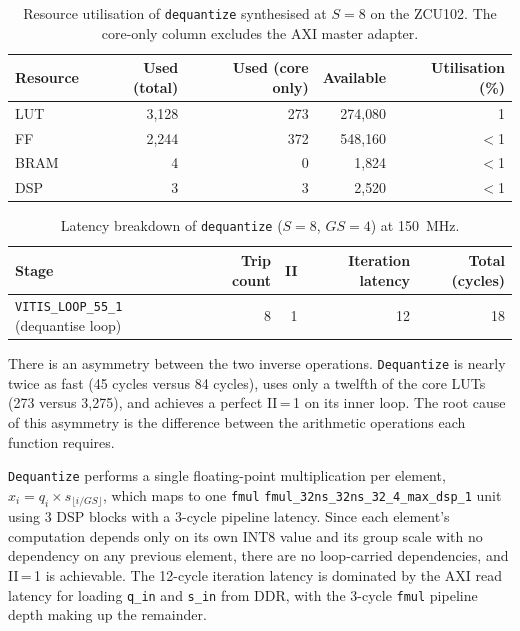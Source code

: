 \begin{table}[H]
  \centering
  \begin{tabular}{lrrrr}
    \toprule
    Resource & Used (total) & Used (core only) & Available & Utilisation (\%) \\
    \midrule
    LUT  & 3{,}128 &   273 & 274{,}080 & 1 \\
    FF   & 2{,}244 &   372 & 548{,}160 & $<$1 \\
    BRAM & 4       &     0 & 1{,}824   & $<$1 \\
    DSP  & 3       &     3 & 2{,}520   & $<$1 \\
    \bottomrule
  \end{tabular}
  \caption{Resource utilisation of \texttt{dequantize} synthesised at
           $S = 8$ on the ZCU102. The core-only column excludes the
           AXI master adapter.}
  \label{tab:dequantize_resources}

\end{table}

\begin{table}[H]
  \centering
  \begin{tabular}{lrrrr}
    \toprule
    Stage & Trip count & II & Iteration latency & Total (cycles) \\
    \midrule
    \texttt{VITIS\_LOOP\_55\_1} (dequantise loop) & 8 & 1 & 12 & 18 \\
    \bottomrule
  \end{tabular}
  \caption{Latency breakdown of \texttt{dequantize} ($S = 8$, $GS = 4$)
           at \SI{150}{\mega\hertz}.}
  \label{tab:dequantize_latency}

\end{table}

There is an asymmetry between the two
inverse operations. \texttt{Dequantize} is nearly twice as fast (45
cycles versus 84 cycles), uses only a twelfth of the core LUTs
(273 versus 3{,}275), and achieves a perfect II\,=\,1 on its inner
loop. The root cause of this asymmetry is the difference between the
arithmetic operations each function requires.

\texttt{Dequantize} performs a single floating-point multiplication per
element, $x_i = q_i \times s_{\lfloor i/GS \rfloor}$, which maps to one
\texttt{fmul} \texttt{fmul\_32ns\_32ns\_32\_4\_max\_dsp\_1} unit using 3 DSP blocks with a 3-cycle pipeline latency.
Since each element's computation depends only on its own INT8 value and its
group scale with no dependency on any previous element, there are no loop-carried
dependencies, and II\,=\,1 is achievable. The 12-cycle iteration latency
is dominated by the AXI read latency for loading \texttt{q\_in} and
\texttt{s\_in} from DDR, with the 3-cycle \texttt{fmul} pipeline depth
making up the remainder.

